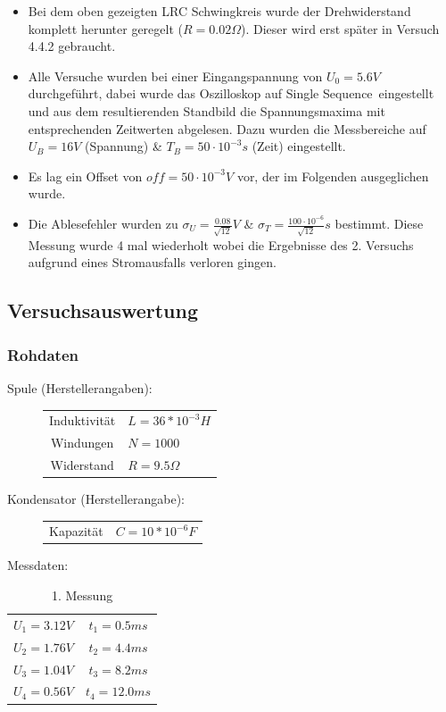 \documentclass[12pt,a4paper]{article}
\begin{document}
\begin{itemize}
\item Bei dem oben gezeigten LRC Schwingkreis wurde der Drehwiderstand komplett herunter geregelt ($R=0.02\Omega$). Dieser wird erst später in Versuch 4.4.2 gebraucht.
 
\item Alle Versuche wurden bei einer Eingangspannung von $U_0=5.6V$ durchgeführt, dabei wurde das Oszilloskop auf \glqq Single Sequence\grqq $\,$ eingestellt und aus dem resultierenden Standbild die Spannungsmaxima mit entsprechenden Zeitwerten abgelesen. Dazu wurden die Messbereiche auf $U_B=16V$ (Spannung) \& $T_B=50 \cdot 10^{-3}s$ (Zeit) eingestellt.
\item Es lag ein Offset von $off=50 \cdot 10^{-3}V$ vor, der im Folgenden ausgeglichen wurde.
\item Die Ablesefehler wurden zu $\sigma_U=\frac{0.08}{\sqrt{12}}V$ \& $\sigma_T=\frac{100\cdot 10^{-6}}{\sqrt{12}}s$ bestimmt.
Diese Messung wurde 4 mal wiederholt wobei die Ergebnisse des 2. Versuchs aufgrund eines Stromausfalls verloren gingen.
\end{itemize}

\newpage
\subsection{Versuchsauswertung}

\subsubsection{Rohdaten}

Spule (Herstellerangaben): 
\begin{figure}[H]\centering
\begin{tabular}{c|l}
Induktivität & $L=36*10^{-3}H$\\ 
Windungen & $N=1000$\\ 
Widerstand & $R=9.5\Omega$ \\
\end{tabular} 
\end{figure}

Kondensator (Herstellerangabe):
\begin{figure}[H]\centering
\begin{tabular}{c|l}
Kapazität & $C=10*10^{-6}F$\\ 
\end{tabular} 
\end{figure}

Messdaten:
\begin{table}[H]\centering
\caption{1. Messung}
\begin{tabular}{c|c}
\hline
$U_1=3.12V$& $t_1=0.5ms$\\ 
$U_2=1.76V$& $t_2=4.4ms$\\ 
$U_3=1.04V$& $t_3=8.2ms$ \\
$U_4=0.56V$& $t_4=12.0ms$ \\
\end{tabular} 
\end{table}
\end{document}
